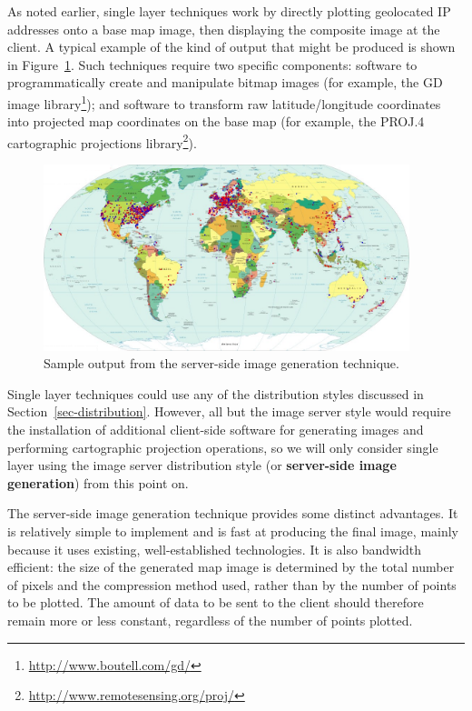 \documentclass[acmtocl,acmnow]{acmtrans2m}
\begin{document}
As noted earlier, single layer techniques work by directly plotting
geolocated IP addresses onto a base map image, then displaying the
composite image at the client. A typical example of the kind of output
that might be produced is shown in Figure~\ref{fig-image}. Such
techniques require two specific components: software to programmatically
create and manipulate bitmap images (for example, the GD image
library\footnote{\url{http://www.boutell.com/gd/}}); and software to
transform raw latitude/longitude coordinates into projected map
coordinates on the base map (for example, the PROJ.4 cartographic
projections library\footnote{\url{http://www.remotesensing.org/proj/}}).


\begin{figure}
	\centering
	\includegraphics[width=0.95\textwidth,keepaspectratio]{ImageGeneration-full}
	\caption{Sample output from the server-side image generation technique.}
	\label{fig-image}
\end{figure}


Single layer techniques could use any of the distribution styles
discussed in Section~\ref{sec-distribution}. However, all but the image
server style would require the installation of additional client-side
software for generating images and performing cartographic projection
operations, so we will only consider single layer using the image
server distribution style (or \textbf{server-side image generation})
from this point on.

The server-side image generation technique provides some distinct
advantages. It is relatively simple to implement and is fast at
producing the final image, mainly because it uses existing,
well-established technologies. It is also bandwidth efficient: the size
of the generated map image is determined by the total number of pixels
and the compression method used, rather than by the number of points to
be plotted. The amount of data to be sent to the client should therefore
remain more or less constant, regardless of the number of points
plotted.
\end{document}
